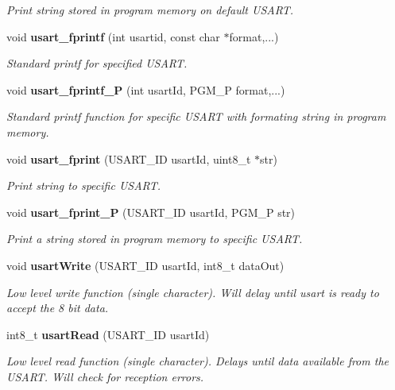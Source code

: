 \begin{DoxyCompactItemize}
\begin{DoxyCompactList}\small\item\em Print string stored in program memory on default U\+S\+A\+R\+T. \end{DoxyCompactList}\item 
void {\bf usart\+\_\+fprintf} (int usartid, const char $\ast$format,...)
\begin{DoxyCompactList}\small\item\em Standard printf for specified U\+S\+A\+R\+T. \end{DoxyCompactList}\item 
void {\bf usart\+\_\+fprintf\+\_\+\+P} (int usart\+Id, P\+G\+M\+\_\+\+P format,...)
\begin{DoxyCompactList}\small\item\em Standard printf function for specific U\+S\+A\+R\+T with formating string in program memory. \end{DoxyCompactList}\item 
void {\bf usart\+\_\+fprint} (U\+S\+A\+R\+T\+\_\+\+I\+D usart\+Id, uint8\+\_\+t $\ast$str)
\begin{DoxyCompactList}\small\item\em Print string to specific U\+S\+A\+R\+T. \end{DoxyCompactList}\item 
void {\bf usart\+\_\+fprint\+\_\+\+P} (U\+S\+A\+R\+T\+\_\+\+I\+D usart\+Id, P\+G\+M\+\_\+\+P str)
\begin{DoxyCompactList}\small\item\em Print a string stored in program memory to specific U\+S\+A\+R\+T. \end{DoxyCompactList}\item 
void {\bf usart\+Write} (U\+S\+A\+R\+T\+\_\+\+I\+D usart\+Id, int8\+\_\+t data\+Out)
\begin{DoxyCompactList}\small\item\em Low level write function (single character). Will delay until usart is ready to accept the 8 bit data. \end{DoxyCompactList}\item 
int8\+\_\+t {\bf usart\+Read} (U\+S\+A\+R\+T\+\_\+\+I\+D usart\+Id)
\begin{DoxyCompactList}\small\item\em Low level read function (single character). Delays until data available from the U\+S\+A\+R\+T. Will check for reception errors. \end{DoxyCompactList}\item 

\end{DoxyCompactItemize}
